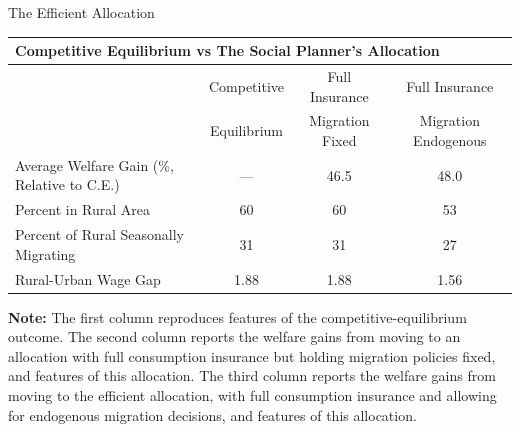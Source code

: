 \documentclass[9pt,pdftex,aspectratio=1610]{beamer}
\theoremstyle{definition}
\begin{document}
\begin{frame}[t]{The Efficient Allocation}
\begin{table}[!t]
\small
\setlength {\tabcolsep}{2.055mm}
\renewcommand{\arraystretch}{1.40}
\begin{center}
\begin{tabular}{l c c c}
\multicolumn{4}{l}{\textbf{Competitive Equilibrium vs The Social Planner's Allocation}} \\
\hline
\hline
						& Competitive & Full Insurance & Full Insurance  \\
						& Equilibrium & Migration Fixed & Migration Endogenous \\
						\cmidrule(lr){2-2} \cmidrule(lr){3-3}     \cmidrule(lr){4-4}
Average Welfare Gain  (\%, Relative to C.E.)      & ---   			& 46.5 			& 48.0  \\
Percent in Rural Area				   & 60 			& 60				&  53 \\
Percent of Rural Seasonally Migrating		   & 31 			& 31				&  27 \\
Rural-Urban Wage Gap				   & 1.88 			& 1.88				&  1.56 \\
\hline
\hline
\end{tabular}
\parbox[c]{5.2in}{%
{\footnotesize  \vspace{0.1cm} \textbf{Note:} The first column reproduces features of the competitive-equilibrium outcome. The second column reports the welfare gains from moving to an allocation with full consumption insurance but holding migration policies fixed, and features of this allocation. The third column reports the welfare gains from moving to the efficient allocation, with full consumption insurance and allowing for endogenous migration decisions, and features of this allocation.}
}
\end{center}
\end{table}
\end{frame}

\end{document}
